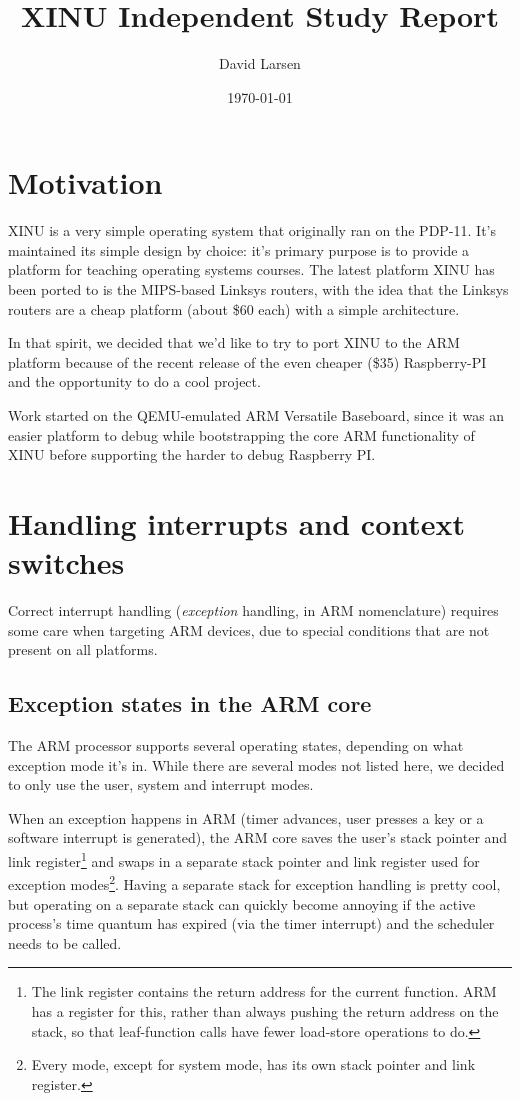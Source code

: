 \documentclass[12pt]{article}
\title{XINU Independent Study Report}
\author{David Larsen}
\date{\today}
\begin{document}
\maketitle

\tableofcontents

\section{Motivation}

XINU is a very simple operating system that originally ran on the PDP-11. It's
maintained its simple design by choice: it's primary purpose is to provide a
platform for teaching operating systems courses. The latest platform XINU has
been ported to is the MIPS-based Linksys routers, with the idea that the
Linksys routers are a cheap platform (about \$60 each) with a simple
architecture.

In that spirit, we decided that we'd like to try to port XINU to the ARM
platform because of the recent release of the even cheaper (\$35) Raspberry-PI
and the opportunity to do a cool project.

Work started on the QEMU-emulated ARM Versatile Baseboard, since it was an
easier platform to debug while bootstrapping the core ARM functionality of XINU
before supporting the harder to debug Raspberry PI.

\section{Handling interrupts and context switches}

Correct interrupt handling ({\em exception} handling, in ARM nomenclature)
requires some care when targeting ARM devices, due to special conditions that
are not present on all platforms.

\subsection{Exception states in the ARM core}

The ARM processor supports several operating states, depending on what
exception mode it's in. While there are several modes not listed here, we
decided to only use the user, system and interrupt modes.

When an exception happens in ARM (timer advances, user presses a key or a
software interrupt is generated), the ARM core saves the user's stack pointer
and link register\footnote{The link register contains the return address for
the current function. ARM has a register for this, rather than always pushing
the return address on the stack, so that leaf-function calls have fewer
load-store operations to do.} and swaps in a separate stack pointer and link
register used for exception modes\footnote{Every mode, except for system mode,
has its own stack pointer and link register.}. Having a separate stack for
exception handling is pretty cool, but operating on a separate stack can
quickly become annoying if the active process's time quantum has expired (via
the timer interrupt) and the scheduler needs to be called.
\end{document}
